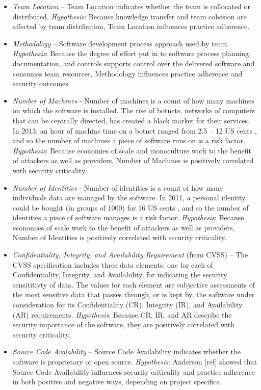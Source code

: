 \begin{itemize}
\item \textit{Team Location} – Team Location indicates whether the team is collocated or distributed. \textit{Hypothesis}: Because knowledge transfer and team cohesion are affected by team distribution, Team Location influences practice adherence.
\item \textit{Methodology} – Software development process approach used by team. \textit{Hypothesis}: Because the degree of effort put in to software process planning, documentation, and controls supports control over the delivered software and consumes team resources, Methodology influences practice adherence and security outcomes.
\item \textit{Number of Machines} - Number of machines is a count of how many machines on which the software is installed. The rise of botnets, networks of computers that can be centrally directed, has created a black market for their services.  In 2013, an hour of machine time on a botnet ranged from 2.5 – 12 US cents , and so the number of machines a piece of software runs on is a risk factor. \textit{Hypothesis}: Because economies of scale and monoculture work to the benefit of attackers as well as providers, Number of Machines is positively correlated with security criticality.
\item \textit{Number of Identities} - Number of identities is a count of how many individuals data are managed by the software.  In 2011, a personal identity could be bought (in groups of 1000) for 16 US cents  , and so the number of identities a piece of software manages is a risk factor. \textit{Hypothesis}: Because economies of scale work to the benefit of attackers as well as providers, Number of Identities is positively correlated with security criticality.
\item \textit{Confidentiality, Integrity, and Availability Requirement} (from CVSS) – The CVSS specification includes three data elements, one for each of Confidentiality, Integrity, and Availability, for indicating the security sensititivty of data. The values for each element are subjective assessments of the most sensitive data that passes through, or is kept by, the software under consideration for its Confidentiality (CR), Integrity (IR), and Availability (AR) requirements. \textit{Hypothesis}: Because CR, IR, and AR describe the security importance of the software, they are positively correlated with security criticality.
\item \textit{Source Code Avalability} – Source Code Availability indicates whether the software is proprietary or open source. \textit{Hypothesis}: Anderson [ref] showed that Source Code Availability influences security criticality and practice adherence in both positive and negative ways, depending on project specifics.
\end{itemize}

